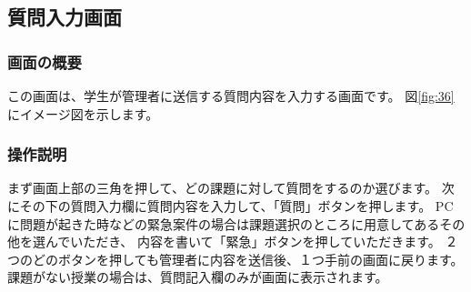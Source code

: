 \newpage



\subsection{質問入力画面}
\subsubsection{画面の概要}
この画面は、学生が管理者に送信する質問内容を入力する画面です。
図\ref{fig:36}にイメージ図を示します。

\subsubsection{操作説明}
まず画面上部の三角を押して、どの課題に対して質問をするのか選びます。
次にその下の質問入力欄に質問内容を入力して、「質問」ボタンを押します。
PCに問題が起きた時などの緊急案件の場合は課題選択のところに用意してあるその他を選んでいただき、
内容を書いて「緊急」ボタンを押していただきます。
２つのどのボタンを押しても管理者に内容を送信後、１つ手前の画面に戻ります。
課題がない授業の場合は、質問記入欄のみが画面に表示されます。


